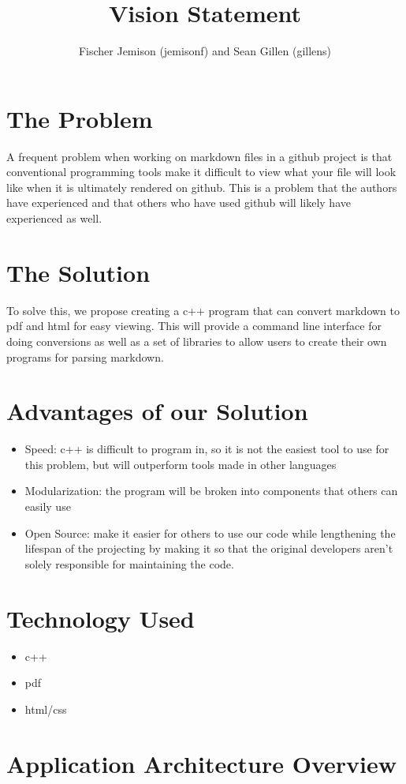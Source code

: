 \documentclass[12pt]{article}
\title{Vision Statement}
\author{Fischer Jemison (jemisonf) and Sean Gillen (gillens)}
\begin{document}
\maketitle
\tableofcontents


\section{The Problem}
A frequent problem when working on markdown files in a github project is that conventional programming tools make it difficult to view what your file will look like when it is ultimately rendered on github. This is a problem that the authors have experienced and that others who have used github will likely have experienced as well.
\section{The Solution}
To solve this, we propose creating a c++ program that can convert markdown to pdf and html for easy viewing. This will provide a command line interface for doing conversions as well as a set of libraries to allow users to create their own programs for parsing markdown.
\section{Advantages of our Solution}
\begin{itemize}
	\item Speed: c++ is difficult to program in, so it is not the easiest tool to use for this problem, but will outperform tools made in other languages
	\item Modularization: the program will be broken into components that others can easily use
	\item Open Source: make it easier for others to use our code while lengthening the lifespan of the projecting by making it so that the original developers aren't solely responsible for maintaining the code.
\end{itemize}
\section{Technology Used}
\begin{itemize}
	\item c++ 
	\item pdf
	\item html/css
\end{itemize}
\section{Application Architecture Overview}
\end{document}
